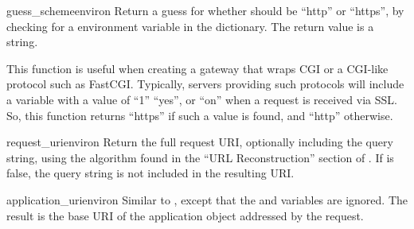 \begin{funcdesc}{guess_scheme}{environ}
Return a guess for whether  should be ``http'' or
``https'', by checking for a  environment variable in the
 dictionary.  The return value is a string.

This function is useful when creating a gateway that wraps CGI or a
CGI-like protocol such as FastCGI.  Typically, servers providing such
protocols will include a  variable with a value of ``1''
``yes'', or ``on'' when a request is received via SSL.  So, this
function returns ``https'' if such a value is found, and ``http''
otherwise.
\end{funcdesc}

\begin{funcdesc}{request_uri}{environ }
Return the full request URI, optionally including the query string,
using the algorithm found in the ``URL Reconstruction'' section of
.  If  is false, the query string is
not included in the resulting URI.
\end{funcdesc}

\begin{funcdesc}{application_uri}{environ}
Similar to , except that the  and
 variables are ignored.  The result is the base URI
of the application object addressed by the request.
\end{funcdesc}

